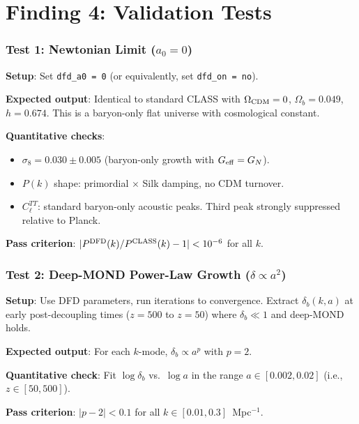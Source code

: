 \documentclass[11pt]{article}
\theoremstyle{definition}
\theoremstyle{remark}
\newcommand{\Geff}{G_{\rm eff}}
\begin{document}
\part{Finding 4: Validation Tests}
\label{part:validation}

\section{Test 1: Newtonian Limit ($a_0 = 0$)}

\textbf{Setup}: Set \texttt{dfd\_a0 = 0} (or equivalently, set
\texttt{dfd\_on = no}).

\textbf{Expected output}: Identical to standard CLASS with
$\Omega_{\rm CDM} = 0$, $\Omega_b = 0.049$, $h = 0.674$. This is a
baryon-only flat universe with cosmological constant.

\textbf{Quantitative checks}:
\begin{itemize}
\item $\sigma_8 = 0.030 \pm 0.005$ (baryon-only growth with $\Geff = G_N$).
\item $P(k)$ shape: primordial $\times$ Silk damping, no CDM turnover.
\item $C_\ell^{TT}$: standard baryon-only acoustic peaks. Third peak
  strongly suppressed relative to Planck.
\end{itemize}

\textbf{Pass criterion}: $|P^{\rm DFD}(k)/P^{\rm CLASS}(k) - 1| < 10^{-6}$
for all $k$.


\section{Test 2: Deep-MOND Power-Law Growth ($\delta \propto a^2$)}

\textbf{Setup}: Use DFD parameters, run iterations to convergence.
Extract $\delta_b(k, a)$ at early post-decoupling times ($z = 500$
to $z = 50$) where $\delta_b \ll 1$ and deep-MOND holds.

\textbf{Expected output}: For each $k$-mode, $\delta_b \propto a^p$
with $p = 2$.

\textbf{Quantitative check}: Fit $\log\delta_b$ vs.\ $\log a$ in
the range $a \in [0.002, 0.02]$ (i.e., $z \in [50, 500]$).

\textbf{Pass criterion}: $|p - 2| < 0.1$ for all $k \in [0.01, 0.3]$~Mpc$^{-1}$.
\end{document}
